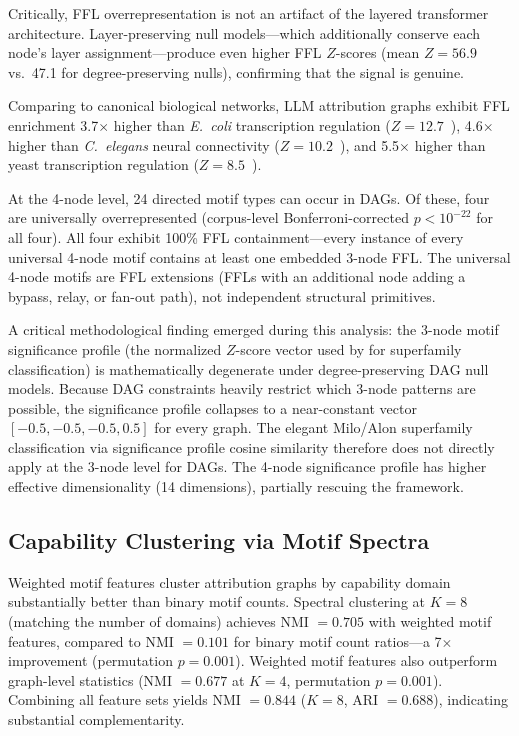 \documentclass[11pt,letterpaper]{article}
\begin{document}
Critically, FFL overrepresentation is not an artifact of the layered transformer architecture. Layer-preserving null models---which additionally conserve each node's layer assignment---produce even higher FFL $Z$-scores (mean $Z = 56.9$ vs.\ 47.1 for degree-preserving nulls), confirming that the signal is genuine.

Comparing to canonical biological networks, LLM attribution graphs exhibit FFL enrichment 3.7$\times$ higher than \emph{E.~coli} transcription regulation ($Z = 12.7$~\citep{Milo2002}), 4.6$\times$ higher than \emph{C.~elegans} neural connectivity ($Z = 10.2$~\citep{Milo2002}), and 5.5$\times$ higher than yeast transcription regulation ($Z = 8.5$~\citep{Milo2002}).

At the 4-node level, 24 directed motif types can occur in DAGs. Of these, four are universally overrepresented (corpus-level Bonferroni-corrected $p < 10^{-22}$ for all four). All four exhibit 100\% FFL containment---every instance of every universal 4-node motif contains at least one embedded 3-node FFL. The universal 4-node motifs are FFL extensions (FFLs with an additional node adding a bypass, relay, or fan-out path), not independent structural primitives.

A critical methodological finding emerged during this analysis: the 3-node motif significance profile (the normalized $Z$-score vector used by \citet{Milo2004} for superfamily classification) is mathematically degenerate under degree-preserving DAG null models. Because DAG constraints heavily restrict which 3-node patterns are possible, the significance profile collapses to a near-constant vector $[-0.5, -0.5, -0.5, 0.5]$ for every graph. The elegant Milo/Alon superfamily classification via significance profile cosine similarity therefore does not directly apply at the 3-node level for DAGs. The 4-node significance profile has higher effective dimensionality (14 dimensions), partially rescuing the framework.

\subsection{Capability Clustering via Motif Spectra}
\label{sec:clustering}

Weighted motif features cluster attribution graphs by capability domain substantially better than binary motif counts. Spectral clustering at $K = 8$ (matching the number of domains) achieves NMI $= 0.705$ with weighted motif features, compared to NMI $= 0.101$ for binary motif count ratios---a 7$\times$ improvement (permutation $p = 0.001$). Weighted motif features also outperform graph-level statistics (NMI $= 0.677$ at $K = 4$, permutation $p = 0.001$). Combining all feature sets yields NMI $= 0.844$ ($K = 8$, ARI $= 0.688$), indicating substantial complementarity.
\end{document}
